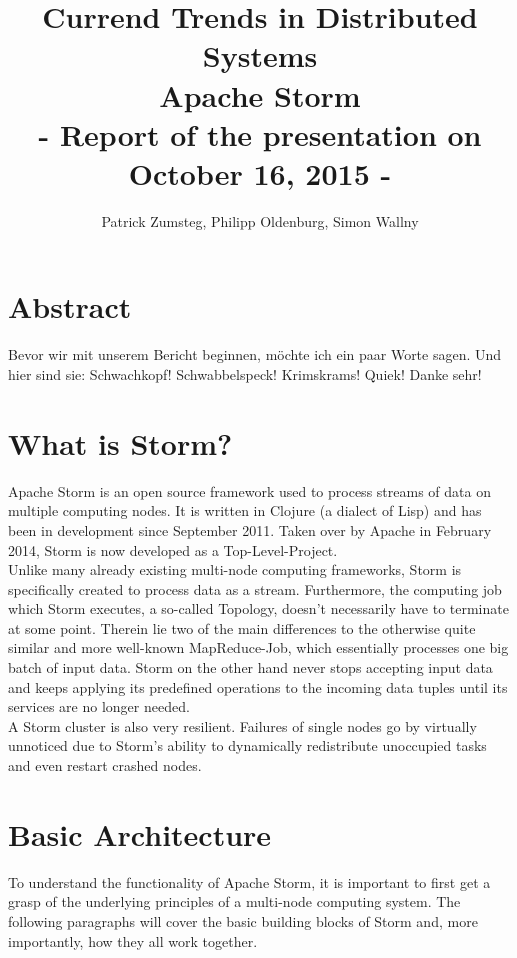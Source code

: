 \documentclass[12pt,a4paper]{article}
\title{Currend Trends in Distributed Systems\\\textbf{Apache Storm}\\\large{- Report of the presentation on October 16, 2015 -}}
\date{}
\author{Patrick Zumsteg, Philipp Oldenburg, Simon Wallny}
\begin{document}
\maketitle
\section{Abstract}
Bevor wir mit unserem Bericht beginnen, möchte ich ein paar Worte sagen. Und hier sind sie: Schwachkopf! Schwabbelspeck! Krimskrams! Quiek! Danke sehr!
\tableofcontents
\section{What is Storm?}
\onehalfspacing
Apache Storm is an open source framework used to process streams of data on multiple computing nodes. It is written in Clojure (a dialect of Lisp) and has been in development since September 2011. Taken over by Apache in February 2014, Storm is now developed as a Top-Level-Project.\\

Unlike many already existing multi-node computing frameworks, Storm is specifically created to process data as a stream. Furthermore, the computing job which Storm executes, a so-called Topology, doesn't necessarily have to terminate at some point. Therein lie two of the main differences to the otherwise quite similar and more well-known MapReduce-Job, which essentially processes one big batch of input data. Storm on the other hand never stops accepting input data and keeps applying its predefined operations to the incoming data tuples until its services are no longer needed.\\

A Storm cluster is also very resilient. Failures of single nodes go by virtually unnoticed due to Storm's ability to dynamically redistribute unoccupied tasks and even restart crashed nodes.\\
\pagebreak

\section{Basic Architecture}

To understand the functionality of Apache Storm, it is important to first get a grasp of the underlying principles of a multi-node computing system. The following paragraphs will cover the basic building blocks of Storm and, more importantly, how they all work together.
\end{document}
